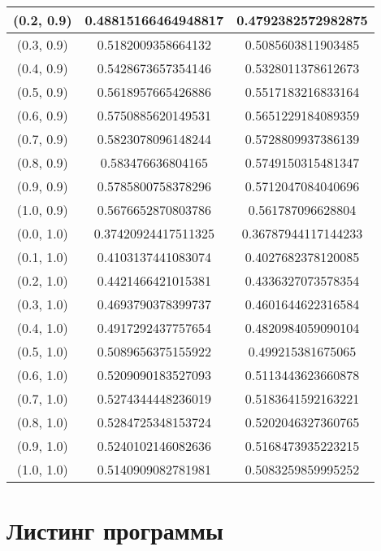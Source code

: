 \begin{table}[H]
\begin{tabular}{|c|c|c|}
\hline
(0.2, 0.9) & 0.48815166464948817 & 0.4792382572982875 \\
\hline
(0.3, 0.9) & 0.5182009358664132 & 0.5085603811903485 \\
\hline
(0.4, 0.9) & 0.5428673657354146 & 0.5328011378612673 \\
\hline
(0.5, 0.9) & 0.5618957665426886 & 0.5517183216833164 \\
\hline
(0.6, 0.9) & 0.5750885620149531 & 0.5651229184089359 \\
\hline
(0.7, 0.9) & 0.5823078096148244 & 0.5728809937386139 \\
\hline
(0.8, 0.9) & 0.583476636804165 & 0.5749150315481347 \\
\hline
(0.9, 0.9) & 0.5785800758378296 & 0.5712047084040696 \\
\hline
(1.0, 0.9) & 0.5676652870803786 & 0.561787096628804 \\
\hline
\hline
(0.0, 1.0) & 0.37420924417511325 & 0.36787944117144233 \\
\hline
(0.1, 1.0) & 0.4103137441083074 & 0.4027682378120085 \\
\hline
(0.2, 1.0) & 0.4421466421015381 & 0.4336327073578354 \\
\hline
(0.3, 1.0) & 0.4693790378399737 & 0.4601644622316584 \\
\hline
(0.4, 1.0) & 0.4917292437757654 & 0.4820984059090104 \\
\hline
(0.5, 1.0) & 0.5089656375155922 & 0.499215381675065 \\
\hline
(0.6, 1.0) & 0.5209090183527093 & 0.5113443623660878 \\
\hline
(0.7, 1.0) & 0.5274344448236019 & 0.5183641592163221 \\
\hline
(0.8, 1.0) & 0.5284725348153724 & 0.5202046327360765 \\
\hline
(0.9, 1.0) & 0.5240102146082636 & 0.5168473935223215 \\
\hline
(1.0, 1.0) & 0.5140909082781981 & 0.5083259859995252 \\
\hline
\end{tabular}
\end{table}
\normalsize

\chapter{Листинг программы}
\scriptsize

\normalsize

